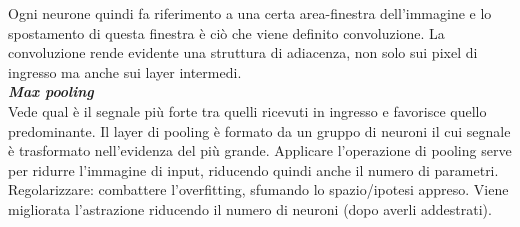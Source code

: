 Ogni neurone quindi fa riferimento a una certa area-finestra dell’immagine e lo spostamento di questa finestra è ciò che viene definito convoluzione. La convoluzione rende evidente una struttura di adiacenza, non solo sui pixel di ingresso ma anche sui layer intermedi.\\

\textbf{\textit{Max pooling}}\\

Vede qual è il segnale più forte tra quelli ricevuti in ingresso e favorisce quello predominante. Il layer di pooling è formato da un gruppo di neuroni il cui segnale è trasformato nell’evidenza del più grande. Applicare l’operazione di pooling serve per ridurre l’immagine di input, riducendo quindi anche il numero di parametri.\\

Regolarizzare: combattere l’overfitting, sfumando lo spazio/ipotesi appreso.
Viene migliorata l’astrazione riducendo il numero di neuroni (dopo averli addestrati).